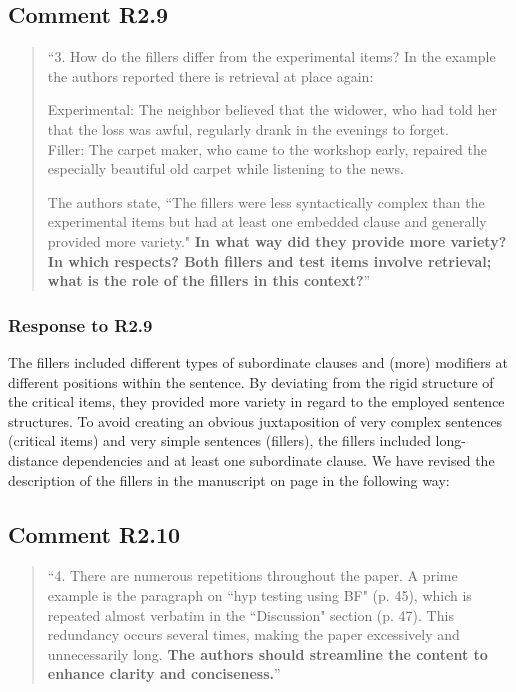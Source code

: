 \documentclass[12pt]{article}
\begin{document}
\subsection*{Comment R2.9}
\begin{quote}
``3. How do the fillers differ from the experimental items? In the example the authors reported there is retrieval at place again:

Experimental: The neighbor believed that the widower, who had told her that the loss was awful, regularly drank in the evenings to forget.\\
Filler: The carpet maker, who came to the workshop early, repaired the especially beautiful old carpet while listening to the news.

The authors state, ``The fillers were less syntactically complex than the experimental items but had at least one embedded clause and generally provided more variety." \textbf{In what way did they provide more variety? In which respects? Both fillers and test items involve retrieval; what is the role of the fillers in this context?}''
\end{quote}
\subsubsection*{Response to R2.9}
The fillers included different types of subordinate clauses and (more) modifiers at different positions within the sentence. By deviating from the rigid structure of the critical items, they provided more variety in regard to the employed sentence structures. To avoid creating an obvious juxtaposition of very complex sentences (critical items) and very simple sentences (fillers), the fillers included long-distance dependencies and at least one subordinate clause. We have revised the description of the fillers in the manuscript on page \pageref{fillers} in the following way:

\begin{quote}
\end{quote}
 
\subsection*{Comment R2.10}
\begin{quote}
``4. There are numerous repetitions throughout the paper. A prime example is the paragraph on ``hyp testing using BF" (p. 45), which is repeated almost verbatim in the ``Discussion" section (p. 47). This redundancy occurs several times, making the paper excessively and unnecessarily long. \textbf{The authors should streamline the content to enhance clarity and conciseness.}''
\end{quote}
\end{document}
